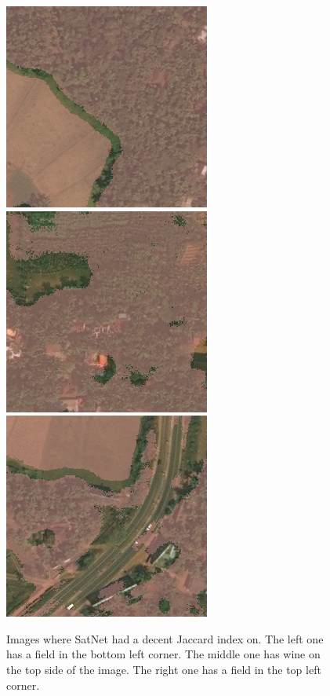 \begin{figure}[h!]
\begin{center}
  \label{satnet_avg}
  \includegraphics[width=.3\linewidth]{images/satellite_images/sat_avg1}
  \includegraphics[width=.3\linewidth]{images/satellite_images/sat_avg2}
  \includegraphics[width=.3\linewidth]{images/satellite_images/sat_avg3}
  \caption{Images where SatNet had a decent Jaccard index on. The left one has a field in the bottom left corner. The middle one has wine on the top side of the image. The right one has a field in the top left corner.}
  \end{center}
\end{figure}

